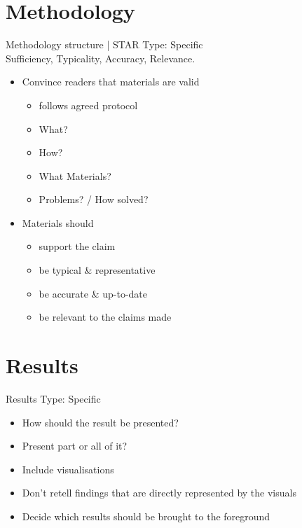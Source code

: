 \documentclass[a4paper,11pt]{article}
\newcounter{counterTODO}\setcounter{counterTODO}{1}
\newcommand\TODO[2][]{%
  \ifshowTodo{%
    \def\varTODOtext{\textcolor{purple}{\texttt{<}\textbf{TODO}\#\arabic{counterTODO}\texttt{: #2>}}}
    \def\varTODOContentLine{\textcolor{purple}{#2}}
    \ifthenelse{\isempty{#1}}%
      {%
        \addcontentsline{tocTODO}{section}{\vspace{-0.3cm}\varTODOContentLine}%
        \varTODOtext\\%
      }%
      {%
        \addcontentsline{tocTODO}{section}{\vspace{-0.3cm}\sout{\varTODOContentLine}}%
      }%
      \stepcounter{counterTODO}%
  }\fi%
}
\newif\ifshowTodo
\begin{document}
  \TODO[]{Finish Introduction}

  

\section{Methodology}

  \begin{notes}{Methodology structure | STAR}
    Type: Specific \\
    Sufficiency, Typicality, Accuracy, Relevance.
    \begin{itemize}
      \item{Convince readers that materials are valid}
        \begin{itemize}
          \item{follows agreed protocol}
          \item{What?}
          \item{How?}
          \item{What Materials?}
          \item{Problems? / How solved?}
        \end{itemize}
      \item{Materials should}
      \begin{itemize}
        \item{support the claim}
        \item{be typical \& representative}
        \item{be accurate \& up-to-date}
        \item{be relevant to the claims made}
      \end{itemize}
    \end{itemize}
  \end{notes}

  \TODO[]{Finish Methodology}

  

  \clearpage

\section{Results}

  \begin{notes}{Results}
    Type: Specific
    \begin{itemize}
      \item{How should the result be presented?}
      \item{Present part or all of it?}
      \item{Include visualisations}
      \item{Don't retell findings that are directly represented by the visuals}
      \item{Decide which results should be brought to the foreground}
    \end{itemize}
  \end{notes}
\end{document}
